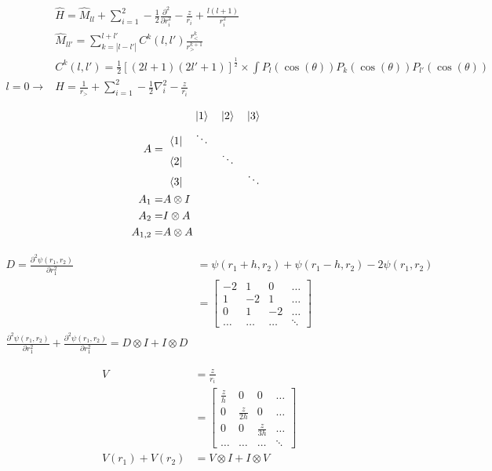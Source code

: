 \documentclass{article}
\begin{document}
\begin{align*}
  &\hat{H}=\hat{M}_{ll}+\sum_{i=1}^2-\frac{1}{2}\frac{\partial^2}{\partial r_i^2}-\frac{z}{r_i}+\frac{l(l+1)}{r_i^2}\\
  &\hat{M}_{ll'}=\sum_{k=|l-l'|}^{l+l'}C^k(l,l')\frac{r^k_<}{r^{k+1}_>}\\
  &C^k(l,l')=\frac{1}{2}[(2l+1)(2l'+1)]^{\frac{1}{2}}\times\int P_l(\cos(\theta))P_k(\cos(\theta))P_{l'}(\cos(\theta))\\
  l=0\rightarrow &H=\frac{1}{r_>}+\sum_{i=1}^2-\frac{1}{2}\nabla^2_i-\frac{z}{r_i}\\
\end{align*}
\begin{align*}
  A=&\begin{tabular}{c @{\hspace{2\tabcolsep}} *{3}{c}}
  &
  \itshape $|1\rangle$ &
  \itshape $|2\rangle$ &
  \itshape $|3\rangle$ 
\\[1ex]
\bfseries $\langle 1 |$& $\ddots$ & & \\
\bfseries $\langle 2 |$& & $\ddots$ & \\
\bfseries $\langle 3 |$& & & $\ddots$ 
\end{tabular}\\
  A_1=&A\otimes I\\
  A_2=&I\otimes A\\
  A_{1,2}=&A\otimes A
\end{align*}

\begin{align*}
  D=\frac{\partial^2\psi(r_1,r_2)}{\partial r_1^2}&=\psi(r_1+h,r_2)+\psi(r_1-h,r_2)-2\psi(r_1,r_2)\\
  &=\begin{bmatrix}
    -2 & 1 & 0 & \dots\\
    1 & -2 & 1 & \dots\\
    0 & 1 & -2 & \dots\\
    \dots & \dots & \dots & \ddots
  \end{bmatrix}\\
  \frac{\partial^2\psi(r_1,r_2)}{\partial r_1^2} + \frac{\partial^2\psi(r_1,r_2)}{\partial r_1^2}=D\otimes I + I\otimes D
\end{align*}

\begin{align*}
  V&=\frac{z}{r_i}\\
  &=\begin{bmatrix}
    \frac{z}{h} & 0 & 0 & \dots\\
    0 & \frac{z}{2h} & 0 & \dots\\
    0 & 0 & \frac{z}{3h} & \dots\\
    \dots & \dots & \dots & \ddots
  \end{bmatrix}\\
  V(r_1)+V(r_2)&=V\otimes I + I\otimes V
\end{align*}
\end{document}
